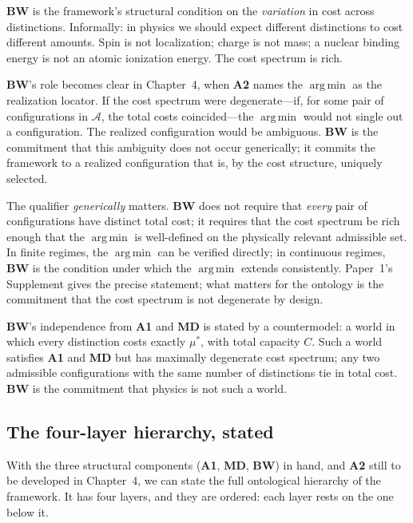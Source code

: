 \documentclass[11pt]{article}
\newcommand{\Aone}{\textbf{A1}}
\newcommand{\argmin}{\mathop{\mathrm{arg\,min}}}
\begin{document}
\noindent \textbf{BW} is the framework's structural condition on the \emph{variation} in cost across distinctions. Informally: in physics we should expect different distinctions to cost different amounts. Spin is not localization; charge is not mass; a nuclear binding energy is not an atomic ionization energy. The cost spectrum is rich.

\textbf{BW}'s role becomes clear in Chapter~4, when \textbf{A2} names the $\argmin$ as the realization locator. If the cost spectrum were degenerate---if, for some pair of configurations in $\mathcal{A}$, the total costs coincided---the $\argmin$ would not single out a configuration. The realized configuration would be ambiguous. \textbf{BW} is the commitment that this ambiguity does not occur generically; it commits the framework to a realized configuration that is, by the cost structure, uniquely selected.

The qualifier \emph{generically} matters. \textbf{BW} does not require that \emph{every} pair of configurations have distinct total cost; it requires that the cost spectrum be rich enough that the $\argmin$ is well-defined on the physically relevant admissible set. In finite regimes, the $\argmin$ can be verified directly; in continuous regimes, \textbf{BW} is the condition under which the $\argmin$ extends consistently. Paper~1's Supplement gives the precise statement; what matters for the ontology is the commitment that the cost spectrum is not degenerate by design.

\textbf{BW}'s independence from \Aone{} and \textbf{MD} is stated by a countermodel: a world in which every distinction costs exactly $\mu^*$, with total capacity $C$. Such a world satisfies \Aone{} and \textbf{MD} but has maximally degenerate cost spectrum; any two admissible configurations with the same number of distinctions tie in total cost. \textbf{BW} is the commitment that physics is not such a world.

\subsection{The four-layer hierarchy, stated}\label{sec:four_layer_hierarchy}

With the three structural components (\Aone{}, \textbf{MD}, \textbf{BW}) in hand, and \textbf{A2} still to be developed in Chapter~4, we can state the full ontological hierarchy of the framework. It has four layers, and they are ordered: each layer rests on the one below it.
\end{document}
